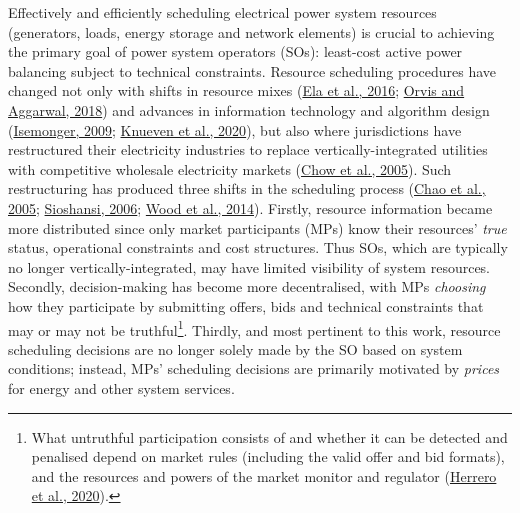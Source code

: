 \documentclass[12pt,a4paper,]{report}
\begin{document}
Effectively and efficiently scheduling electrical power system resources
(generators, loads, energy storage and network elements) is crucial to
achieving the primary goal of power system operators (SOs): least-cost
active power balancing subject to technical constraints. Resource
scheduling procedures have changed not only with shifts in resource
mixes (\protect\hyperlink{ref-elaWholesaleElectricityMarket2016}{Ela et
al., 2016};
\protect\hyperlink{ref-orvisRefiningCompetitiveElectricity2018}{Orvis
and Aggarwal, 2018}) and advances in information technology and
algorithm design
(\protect\hyperlink{ref-isemongerEvolvingDesignRTO2009}{Isemonger,
2009};
\protect\hyperlink{ref-knuevenMixedintegerProgrammingFormulations2020}{Knueven
et al., 2020}), but also where jurisdictions have restructured their
electricity industries to replace vertically-integrated utilities with
competitive wholesale electricity markets
(\protect\hyperlink{ref-chowElectricityMarketDesign2005}{Chow et al.,
2005}). Such restructuring has produced three shifts in the scheduling
process (\protect\hyperlink{ref-chaoInterfaceEngineeringMarket2005}{Chao
et al., 2005};
\protect\hyperlink{ref-sioshansiElectricityMarketReform2006}{Sioshansi,
2006}; \protect\hyperlink{ref-woodPowerGenerationOperation2014}{Wood et
al., 2014}). Firstly, resource information became more distributed since
only market participants (MPs) know their resources' \emph{true} status,
operational constraints and cost structures. Thus SOs, which are
typically no longer vertically-integrated, may have limited visibility
of system resources. Secondly, decision-making has become more
decentralised, with MPs \emph{choosing} how they participate by
submitting offers, bids and technical constraints that may or may not be
truthful\footnote{What untruthful participation consists of and whether
  it can be detected and penalised depend on market rules (including the
  valid offer and bid formats), and the resources and powers of the
  market monitor and regulator
  (\protect\hyperlink{ref-herreroEvolvingBiddingFormats2020}{Herrero et
  al., 2020}).}. Thirdly, and most pertinent to this work, resource
scheduling decisions are no longer solely made by the SO based on system
conditions; instead, MPs' scheduling decisions are primarily motivated
by \emph{prices} for energy and other system services.
\end{document}
